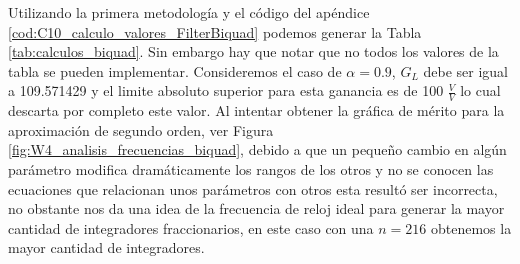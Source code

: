 	Utilizando la primera metodología y el código del apéndice \ref{cod:C10_calculo_valores_FilterBiquad} podemos generar la Tabla \ref{tab:calculos_biquad}. Sin embargo hay que notar que no todos los valores de la tabla se pueden implementar. Consideremos el caso de $\alpha = 0.9$, $G_{L}$ debe ser igual a 109.571429 y el limite absoluto superior para esta ganancia es de 100 $\frac{V}{V}$ lo cual descarta por completo este valor. Al intentar obtener la gráfica de mérito para la aproximación de segundo orden, ver Figura \ref{fig:W4_analisis_frecuencias_biquad}, debido a que un pequeño cambio en algún parámetro modifica dramáticamente los rangos de los otros y no se conocen las ecuaciones que relacionan unos parámetros con otros esta resultó ser incorrecta, no obstante nos da una idea de la frecuencia de reloj ideal para generar la mayor cantidad de integradores fraccionarios, en este caso con una $n = 216$ obtenemos la mayor cantidad de integradores. 
	
